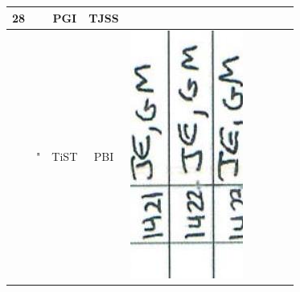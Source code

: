 \documentclass[10pt]{article}
\begin{document}
\begin{center}
\begin{tabular}{|c|c|c|c|c|c|c|c|c|c|c|}
\hline
28 &  & PGI & TJSS & \multicolumn{3}{|l|}{} &  &  &  &  \\
\hline
 & " & TiST & PBI & \multicolumn{3}{|l|}{\includegraphics[max width=\textwidth]{2025_02_27_dd68c3d38de88f0516d9g-082(2)}
}
\end{tabular}
\end{center}
\end{document}
